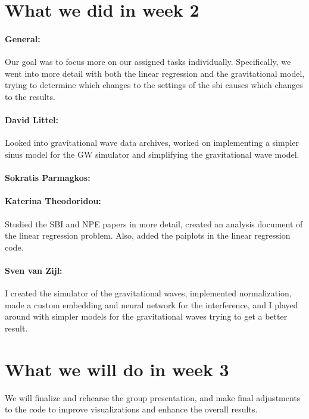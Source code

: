 \documentclass{article}
\begin{document}
\section*{What we did in week 2}

\paragraph{General:}
Our goal was to focus more on our assigned tasks individually. Specifically, we went into more detail with both the linear regression and the gravitational model, trying to determine which changes to the settings of the sbi causes which changes to the results.

\paragraph{David Littel:}
Looked into gravitational wave data archives, worked on implementing a simpler sinus model for the GW simulator and simplifying the gravitational wave model.

\paragraph{Sokratis Parmagkos:}


\paragraph{Katerina Theodoridou:}
Studied the SBI and NPE papers in more detail, created an analysis document of the linear regression problem. Also, added the paiplots in the linear regression code. 

\paragraph{Sven van Zijl:}
I created the simulator of the gravitational waves, implemented normalization, made a custom embedding and neural network for the interference, and I played around with simpler models for the gravitational waves trying to get a better result.


\section*{What we will do in week 3}
We will finalize and rehearse the group presentation, and make final adjustments to the code to improve visualizations and enhance the overall results.
\end{document}

